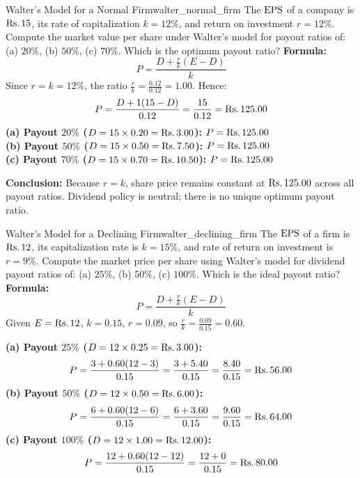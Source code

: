 \begin{example}{Walter's Model for a Normal Firm}{walter_normal_firm}
The $\operatorname{EPS}$ of a company is $\text{Rs.}\, 15$, its rate of capitalization $k = 12\%$, and return on investment $r = 12\%$. Compute the market value per share under Walter's model for payout ratios of: (a) $20\%$, (b) $50\%$, (c) $70\%$. Which is the optimum payout ratio?
\tcblower
\textbf{Formula:}
\begin{equation*}
    P = \frac{D + \frac{r}{k}(E - D)}{k}
\end{equation*}
Since $r = k = 12\%$, the ratio $\frac{r}{k} = \frac{0.12}{0.12} = 1.00$. Hence:
\begin{equation*}
    P = \frac{D + 1(15 - D)}{0.12} = \frac{15}{0.12} = \text{Rs.}\, 125.00
\end{equation*}
\textbf{(a) Payout $20\%$ ($D = 15 \times 0.20 = \text{Rs.}\, 3.00$):} $P = \text{Rs.}\, 125.00$ \\
\textbf{(b) Payout $50\%$ ($D = 15 \times 0.50 = \text{Rs.}\, 7.50$):} $P = \text{Rs.}\, 125.00$ \\
\textbf{(c) Payout $70\%$ ($D = 15 \times 0.70 = \text{Rs.}\, 10.50$):} $P = \text{Rs.}\, 125.00$

\textbf{Conclusion:} Because $r = k$, share price remains constant at $\text{Rs.}\, 125.00$ across all payout ratios. Dividend policy is neutral; there is no unique optimum payout ratio.
\end{example}

\begin{example}{Walter's Model for a Declining Firm}{walter_declining_firm}
The $\operatorname{EPS}$ of a firm is $\text{Rs.}\, 12$, its capitalization rate is $k = 15\%$, and rate of return on investment is $r = 9\%$. Compute the market price per share using Walter's model for dividend payout ratios of: (a) $25\%$, (b) $50\%$, (c) $100\%$. Which is the ideal payout ratio?
\tcblower
\textbf{Formula:}
\begin{equation*}
    P = \frac{D + \frac{r}{k}(E - D)}{k}
\end{equation*}
Given $E = \text{Rs.}\, 12$, $k = 0.15$, $r = 0.09$, so $\frac{r}{k} = \frac{0.09}{0.15} = 0.60$.

\textbf{(a) Payout $25\%$ ($D = 12 \times 0.25 = \text{Rs.}\, 3.00$):}
\begin{equation*}
    P = \frac{3 + 0.60(12 - 3)}{0.15} = \frac{3 + 5.40}{0.15} = \frac{8.40}{0.15} = \text{Rs.}\, 56.00
\end{equation*}
\textbf{(b) Payout $50\%$ ($D = 12 \times 0.50 = \text{Rs.}\, 6.00$):}
\begin{equation*}
    P = \frac{6 + 0.60(12 - 6)}{0.15} = \frac{6 + 3.60}{0.15} = \frac{9.60}{0.15} = \text{Rs.}\, 64.00
\end{equation*}
\textbf{(c) Payout $100\%$ ($D = 12 \times 1.00 = \text{Rs.}\, 12.00$):}
\begin{equation*}
    P = \frac{12 + 0.60(12 - 12)}{0.15} = \frac{12 + 0}{0.15} = \text{Rs.}\, 80.00
\end{equation*}
\end{example}

